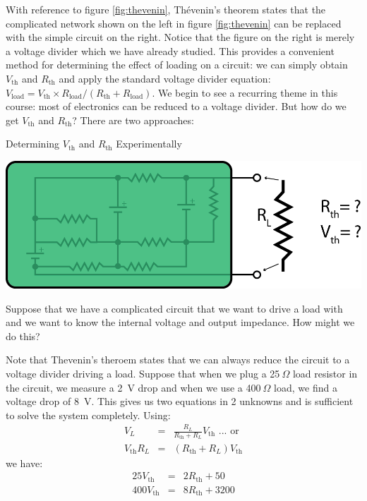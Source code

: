\documentclass{tufte-book}
\begin{document}
With reference to figure \ref{fig:thevenin}, Th\'evenin's theorem states that the complicated network shown on the left in figure \ref{fig:thevenin} can be replaced with the simple circuit on the right. Notice that the figure on the right is merely a voltage divider which we have already studied. This provides a convenient method for determining the effect of loading on a circuit: we can simply obtain $V_\text{th}$ and $R_\text{th}$ and apply the standard voltage divider equation: $V_\text{load} = V_\text{th}\times R_\text{load}/(R_\text{th}+R_\text{load})$. We begin to see a recurring theme in this course: most of electronics can be reduced to a voltage divider. But how do we get $V_\text{th}$ and $R_\text{th}$? There are two approaches:

\begin{myexample}[label = ex:det_thev_exp]{Determining $V_\text{th}$ and $R_\text{th}$ Experimentally}

{\centering
     \includegraphics{thvn_ex_1.png}
      \par
}

Suppose that we have a complicated circuit that we want to drive a load with and we want to know the internal voltage and output impedance. How might we do this?

\noindent Note that Thevenin's theroem states that we can always reduce the circuit to a voltage divider driving a load. Suppose that when we plug a 25$~\Omega$ load resistor in the circuit, we measure a 2~V drop and when we use a 400$~\Omega$ load, we find a voltage drop of 8~V. This gives us two equations in 2 unknowns and is sufficient to solve the system completely. Using:
\begin{eqnarray*}
V_L & = &  \frac{R_L}{R_\text{th} + R_L}V_\text{th}\text{             ... or} \\
V_\text{th} R_L &=& \left(R_\text{th} + R_L\right)V_\text{th}
\end{eqnarray*}
\noindent we have:
\begin{eqnarray*}
25V_\text{th} &=& 2R_\text{th} + 50 \\
400V_\text{th} &=& 8R_\text{th} + 3200
\end{eqnarray*}


\end{myexample}
\end{document}
